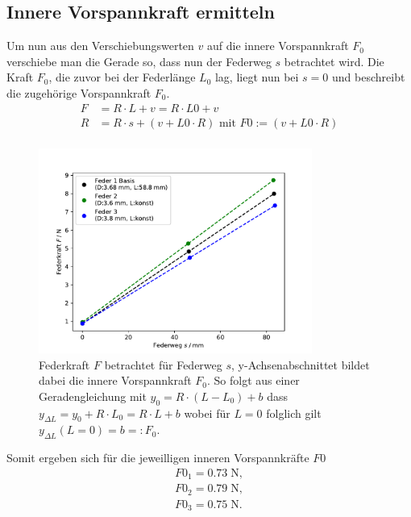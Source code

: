 \subsection{Innere Vorspannkraft ermitteln}
\label{sec:vorspannkraft}
Um nun aus den Verschiebungswerten $v$ auf die innere Vorspannkraft $F_0$ verschiebe
man die Gerade so, dass nun der Federweg $s$ betrachtet wird.
Die Kraft $F_0$, die zuvor bei der Federlänge $L_0$ lag, liegt nun bei $s=0$
und beschreibt die zugehörige Vorspannkraft $F_0$.
\begin{align*}
  F&=R \cdot L + v=R\cdot L0+v\\
  R&=R \cdot s + (v+L0 \cdot R) \text{ mit }F0:= (v+L0 \cdot R) \\
\end{align*}
\begin{figure}[H]
  \center
  \includegraphics[width=0.8\textwidth]{plots/f0_123_dia.pdf}
  \caption
  {
    Federkraft $F$ betrachtet für Federweg $s$, y-Achsenabschnittet bildet dabei die innere Vorspannkraft $F_0$.
    So folgt aus einer Geradengleichung mit $y_0=R\cdot(L-L_0)+b$ dass $y_{\Delta L}=y_0+R \cdot L_0=R \cdot L+b$
    wobei für $L=0$ folglich gilt $y_{\Delta L}(L=0)=b=:F_0$.
  }
\end{figure}
Somit ergeben sich für die jeweilligen inneren Vorspannkräfte $F0$
\begin{align*}
  F0_1=  0.73 \;\si{\N},\\
  F0_2=  0.79 \;\si{\N},\\
  F0_3=  0.75 \;\si{\N}.\\
\end{align*}



